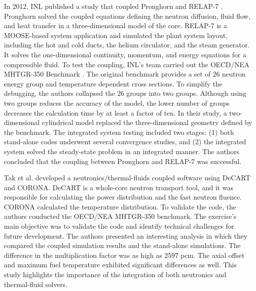 In 2012, \gls{INL} published a study \cite{j_ortensi_initial_2012} that coupled Pronghorn and RELAP-7 \cite{andrs_relap-7_2012}.
Pronghorn solved the coupled equations defining the neutron diffusion, fluid flow, and heat transfer in a three-dimensional model of the core.
RELAP-7 is a MOOSE-based system application and simulated the plant system layout, including the hot and cold ducts, the helium circulator, and the steam generator.
It solves the one-dimensional continuity, momentum, and energy equations for a compressible fluid.
To test the coupling, INL's team carried out the OECD/NEA MHTGR-350 Benchmark \cite{oecd_nea_coupled_2020}.
The original benchmark provides a set of 26 neutron energy group and temperature dependent cross sections.
To simplify the debugging, the authors collapsed the 26 groups into two groups.
Although using two groups reduces the accuracy of the model, the lower number of groups decreases the calculation time by at least a factor of ten.
In their study, a two-dimensional cylindrical model replaced the three-dimensional geometry defined by the benchmark.
The integrated system testing included two stages: (1) both stand-alone codes underwent several convergence studies, and (2) the integrated system solved the steady-state problem in an integrated manner.
The authors concluded that the coupling between Pronghorn and RELAP-7 was successful.

Tak et al. \cite{tak_coupled_2016} developed a neutronics/thermal-fluids coupled software using DeCART \cite{kaeri_decart_2007} and CORONA.
DeCART is a whole-core neutron transport tool, and it was responsible for calculating the power distribution and the fast neutron fluence.
CORONA calculated the temperature distribution.
To validate the code, the authors conducted the OECD/NEA MHTGR-350 benchmark.
The exercise's main objective was to validate the code and identify technical challenges for future development.
The authors presented an interesting analysis in which they compared the coupled simulation results and the stand-alone simulations.
The difference in the multiplication factor was as high as 2597 pcm.
The axial offset and maximum fuel temperature exhibited significant differences as well.
This study highlights the importance of the integration of both neutronics and thermal-fluid solvers.

